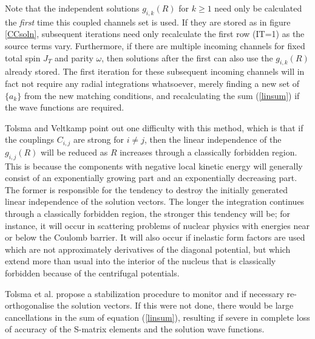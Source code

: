 \documentclass[11pt,a4paper]{article}
\begin{document}
Note that the independent solutions $ g_{i,k} (R)$ for $k \geq 1$
need only be calculated the {\em first} time this coupled channels
set is used. If they are stored as in figure \ref{CCsoln},
subsequent iterations need only recalculate the first row (IT=1)
as the source terms vary.  Furthermore, if there are multiple incoming
channels for fixed total spin $J_T$ and parity $\omega$, then
solutions after the first can also use the $g_{i,k} (R)$ already
stored. The first iteration for these subsequent incoming channels will in
fact not require any radial integrations whatsoever, merely finding a new
set of $ \{ a_k \} $ from the new matching conditions,
and recalculating the sum (\ref{linsum}) if the
wave functions are required.

Tolsma and Veltkamp \cite{TOLV}
point out one difficulty with this method, which is that if the couplings
$ C_{i,j} $ are strong for $ i \neq j$, then the linear
independence of the $ g_{i,j} (R)$ will be reduced as $R$
increases through a classically forbidden region.  This is because the
components with negative local kinetic energy will generally consist of an
exponentially growing part and an exponentially decreasing part.  The
former is responsible for the tendency to destroy the initially generated
linear independence of the solution vectors. The longer the integration
continues through a classically forbidden region, the stronger this
tendency will be; for instance, it will occur in scattering problems of
nuclear physics with energies near or below the Coulomb barrier. It will
also occur if inelastic form factors are used which are not approximately
derivatives of the diagonal potential, but which extend more than usual
into the interior of the nucleus that is classically forbidden because
of the centrifugal potentials.

Tolsma et al. \cite{TOLV} propose a stabilization procedure to
monitor and if necessary re-orthogonalise the solution vectors.  If this
were not done, there would be large cancellations in the sum of equation
(\ref{linsum}), resulting if severe in complete loss of accuracy of the
S-matrix elements and the solution wave functions.
\end{document}
